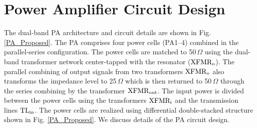 \documentclass{IEEEtran}
\begin{document}
 






\section{Power Amplifier Circuit Design}
The dual-band PA architecture and circuit details are shown in Fig. \ref{PA_Proposed}. The PA comprises four power cells (PA1--4) combined in the parallel-series configuration. The power cells are matched to 50\,$\Omega$ using the dual-band transformer network center-tapped with the resonator ($\rm XFMR_o$). The parallel combining of output signals from two transformers $\rm XFMR_o$ also transforms the impedance level to 25\,$\Omega$ which is then returned to 50\,$\Omega$ through the series combining by the transformer $\rm XFMR_{out}$. The input power is divided between the power cells using the transformers $\rm XFMR_i$ and the transmission lines $\rm TL_{in}$. The power cells are realized using differential double-stacked structure shown in Fig. \ref{PA_Proposed}.  We discuss details of the PA circuit design. 
\end{document}
